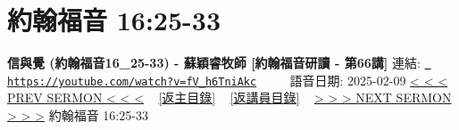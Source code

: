 \documentclass{book}
\begin{document}
\section{約翰福音 16:25-33}
\label{sec:fV_h6TniAkc}
\textbf{信與覺 (約翰福音16\_25-33) - 蘇穎睿牧師 [約翰福音研讀 - 第66講]}
\newline
\newline
連結: \href{https://youtube.com/watch?v=fV_h6TniAkc}{\texttt{ https://youtube.com/watch?v=fV\_h6TniAkc}} ~~~~ 語音日期: 2025-02-09 
\newline
\newline
\hyperref[sec:HaGDtN4u47U]{< < < PREV SERMON < < <}
~
\hyperlink{toc}{[返主目錄]}
~
\hyperref[ch:preacher9]{[返講員目錄]}
~
\hyperref[sec:wiDRWRXrtjM]{> > > NEXT SERMON > > >}
\newline
\newline
約翰福音 16:25-33
\newline
\end{document}
